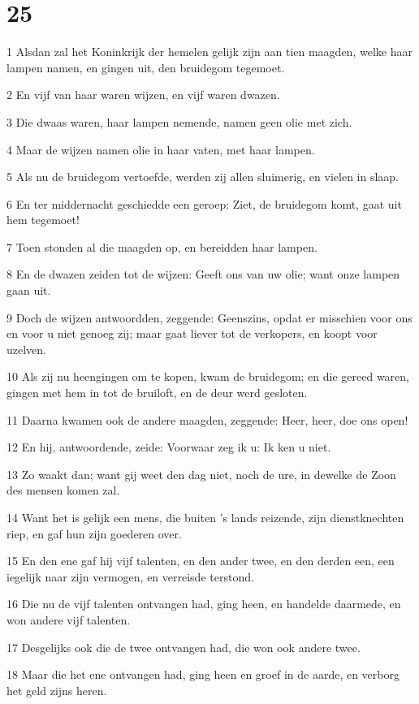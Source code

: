 \chapter{25}

\par 1 Alsdan zal het Koninkrijk der hemelen gelijk zijn aan tien maagden, welke haar lampen namen, en gingen uit, den bruidegom tegemoet.
\par 2 En vijf van haar waren wijzen, en vijf waren dwazen.
\par 3 Die dwaas waren, haar lampen nemende, namen geen olie met zich.
\par 4 Maar de wijzen namen olie in haar vaten, met haar lampen.
\par 5 Als nu de bruidegom vertoefde, werden zij allen sluimerig, en vielen in slaap.
\par 6 En ter middernacht geschiedde een geroep: Ziet, de bruidegom komt, gaat uit hem tegemoet!
\par 7 Toen stonden al die maagden op, en bereidden haar lampen.
\par 8 En de dwazen zeiden tot de wijzen: Geeft ons van uw olie; want onze lampen gaan uit.
\par 9 Doch de wijzen antwoordden, zeggende: Geenszins, opdat er misschien voor ons en voor u niet genoeg zij; maar gaat liever tot de verkopers, en koopt voor uzelven.
\par 10 Als zij nu heengingen om te kopen, kwam de bruidegom; en die gereed waren, gingen met hem in tot de bruiloft, en de deur werd gesloten.
\par 11 Daarna kwamen ook de andere maagden, zeggende: Heer, heer, doe ons open!
\par 12 En hij, antwoordende, zeide: Voorwaar zeg ik u: Ik ken u niet.
\par 13 Zo waakt dan; want gij weet den dag niet, noch de ure, in dewelke de Zoon des mensen komen zal.
\par 14 Want het is gelijk een mens, die buiten 's lands reizende, zijn dienstknechten riep, en gaf hun zijn goederen over.
\par 15 En den ene gaf hij vijf talenten, en den ander twee, en den derden een, een iegelijk naar zijn vermogen, en verreisde terstond.
\par 16 Die nu de vijf talenten ontvangen had, ging heen, en handelde daarmede, en won andere vijf talenten.
\par 17 Desgelijks ook die de twee ontvangen had, die won ook andere twee.
\par 18 Maar die het ene ontvangen had, ging heen en groef in de aarde, en verborg het geld zijns heren.
